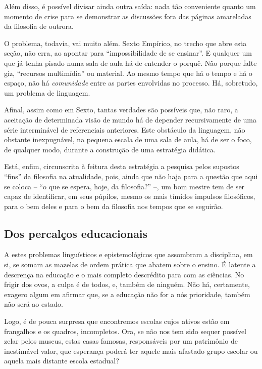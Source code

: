 \documentclass[12pt,a4paper]{article}
\begin{document}
	Além disso, é possível divisar ainda outra 
	saída: nada tão conveniente quanto um momento de 
	crise para se demonstrar as discussões fora das páginas amareladas 
	da filosofia de outrora. 

	O problema, todavia, vai muito além. Sexto Empírico, no trecho que 
	abre esta seção, não erra, ao apontar para “impossibilidade de se 
	ensinar”. E qualquer um que já tenha pisado numa sala de aula há de 
	entender o porquê. Não porque falte giz, “recursos multimídia” ou 
	material. Ao mesmo tempo que há o tempo e há o espaço, não há 
	\textit{comunidade} entre as partes envolvidas no processo. Há, 
	sobretudo, um problema de linguagem. 

	Afinal, assim como em Sexto, tantas verdades são possíveis que, 
	não raro, a aceitação de determinada visão de mundo há de 
	depender recursivamente de uma série interminável de referenciais 
	anteriores. Este obstáculo da linguagem, não obstante inexpugnável, 
	na pequena escala de uma sala de aula, há de ser o foco, de qualquer 
	modo, durante a construção de uma estratégia didática. 

	Está, enfim, circunscrita à feitura desta estratégia a pesquisa 
	pelos supostos “fins” da filosofia na atualidade, pois, ainda que 
	não haja para a questão que aqui se coloca -- “o que se espera, 
	hoje, da filosofia?” --, um bom mestre tem de ser capaz de 
	identificar, em seus púpilos, mesmo os mais tímidos impulsos 
	filosóficos, para o bem deles e para o bem da filosofia nos 
	tempos que se seguirão. 

	\newpage

	\subsection{Dos percalços educacionais}

	A estes problemas linguísticos e epistemológicos que assombram 
	a disciplina, em si, se somam as mazelas de ordem prática que abatem 
	sobre o ensino. É latente a descrença na educação e o mais completo 
	descrédito para com as ciências. No frigir dos ovos, a culpa é de 
	todos, e, também de ninguém. Não há, certamente, exagero algum em 
	afirmar que, se a educação não for a nós prioridade, também não 
	será ao estado. 

	Logo, é de pouca surpresa que encontremos escolas cujos ativos estão 
	em frangalhos e os quadros, incompletos. Ora, se não nos tem sido 
	sequer possível zelar pelos museus, estas casas famosas, responsáveis 
	por um patrimônio de inestimável valor, que esperança poderá ter 
	aquele mais afastado grupo escolar ou aquela mais distante escola 
	estadual? 
\end{document}
